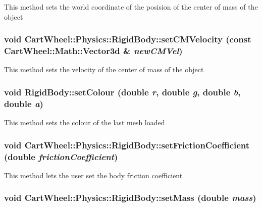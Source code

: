 This method sets the world coordinate of the posision of the center of mass of the object \hypertarget{classCartWheel_1_1Physics_1_1RigidBody_a86bb81208753da6faabadd52c5151429}{
\subsubsection[{setCMVelocity}]{\setlength{\rightskip}{0pt plus 5cm}void CartWheel::Physics::RigidBody::setCMVelocity (const {\bf CartWheel::Math::Vector3d} \& {\em newCMVel})}}
\label{classCartWheel_1_1Physics_1_1RigidBody_a86bb81208753da6faabadd52c5151429}
This method sets the velocity of the center of mass of the object \hypertarget{classCartWheel_1_1Physics_1_1RigidBody_a02091e3e2f45c75b95697aa3acad0fe1}{
\subsubsection[{setColour}]{\setlength{\rightskip}{0pt plus 5cm}void RigidBody::setColour (double {\em r}, \/  double {\em g}, \/  double {\em b}, \/  double {\em a})}}
\label{classCartWheel_1_1Physics_1_1RigidBody_a02091e3e2f45c75b95697aa3acad0fe1}
This method sets the colour of the last mesh loaded \hypertarget{classCartWheel_1_1Physics_1_1RigidBody_a325cb4000d1c8f03b1dac250848e657c}{
\subsubsection[{setFrictionCoefficient}]{\setlength{\rightskip}{0pt plus 5cm}void CartWheel::Physics::RigidBody::setFrictionCoefficient (double {\em frictionCoefficient})}}
\label{classCartWheel_1_1Physics_1_1RigidBody_a325cb4000d1c8f03b1dac250848e657c}
This method lets the user set the body friction coefficient \hypertarget{classCartWheel_1_1Physics_1_1RigidBody_ac3cefd3c64d69b3fd4ed991f93639e1c}{
\subsubsection[{setMass}]{\setlength{\rightskip}{0pt plus 5cm}void CartWheel::Physics::RigidBody::setMass (double {\em mass})}}
